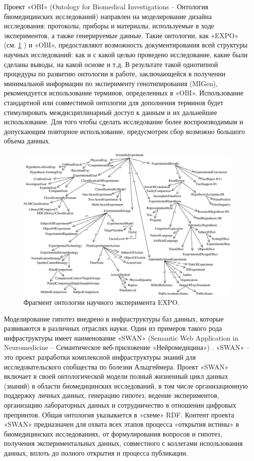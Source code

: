 Проект «OBI» (Ontology for Biomedical Investigations – Онтология биомедицинских исследований) 
\cite{brinkman2010modeling} направлен на моделирование дизайна исследования: протоколы, приборы и материалы, 
используемые в ходе экспериментов, а также генерируемые данные. Такие онтологии, как «EXPO» 
\cite{soldatova2006ontology} (см. \cref{fig:EXPO} ) и «OBI», предоставляют возможность документирования всей структуры 
научных исследований: как и с какой целью проведено исследование, какие были сделаны выводы, на какой основе и т.д. 
В результате такой однотипной процедуры по развитию онтологии в работе, заключающейся в получении минимальной 
информации по эксперименту генотипирования (MIGen), рекомендуется использование терминов, определенных в «OBI». 
Использование стандартной или совместимой онтологии для дополнения терминов будет стимулировать междисциплинарный 
доступ к данным и их дальнейшее использование. Для того чтобы сделать исследование более воспроизводимым и допускающим 
повторное использование, предусмотрен сбор возможно большого объема данных.

\begin{figure}[ht]
    \centering
    \includegraphics[width=1.0\linewidth]{images/EXPO_onto.png}
    \caption{Фрагмент онтологии научного эксперимента EXPO.}\label{fig:EXPO}
\end{figure}

Моделирование гипотез внедрено в инфраструктуры баз данных, которые развиваются в различных отраслях науки. Один из 
примеров такого рода инфраструктуры имеет наименование «SWAN» (Semantic Web Application in Neuromedicine – 
Семантическое веб-приложение «Нейромедицина») \cite{gao2006swan}. «SWAN» – это проект разработки комплексной 
инфраструктуры знаний для исследовательского сообщества по болезни Альцгеймера. Проект «SWAN» включает в своей 
онтологической модели полный жизненный цикл данных (знаний) в области биомедицинских исследований, в том числе 
организационную поддержку личных данных, генерацию гипотез, ведение экспериментов, организацию лабораторных данных 
и сотрудничество в отношении цифровых препринтов. Общая онтология указывается в «схеме» RDF. Контент проекта «SWAN» 
предназначен для охвата всех этапов процесса «открытия истины» в биомедицинских исследованиях, от формулирования 
вопросов и гипотез, получения экспериментальных данных, совместного с коллегами использования данных, вплоть до полного 
открытия и процесса публикации.

